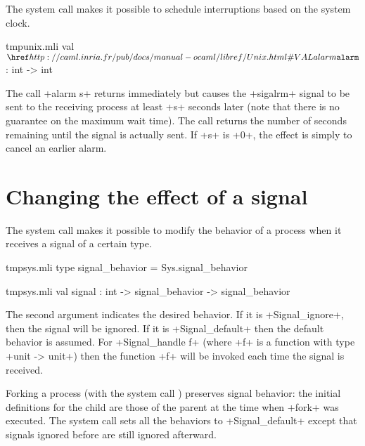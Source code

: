 The system call  makes it possible to schedule
interruptions based on the system clock.

%
\begin{listingcodefile}{tmpunix.mli}
val $\libvalue{Unix}{alarm}$ : int -> int
\end{listingcodefile}
%

The call \ml+alarm s+ returns immediately but causes the \ml+sigalrm+ 
signal to be sent to the receiving process at least \ml+s+ seconds later 
(note that there is no guarantee on the maximum wait time).  The call returns 
the number of seconds remaining until the signal is actually sent.  
If \ml+s+ is \ml+0+, the effect is simply to cancel an earlier alarm.

\section{Changing the effect of a signal}

The system call  makes it possible to modify the behavior
of a process when it receives a signal of a certain type.

%
\begin{codefile}{tmpsys.mli}
type signal_behavior = Sys.signal_behavior
\end{codefile}
%
\begin{listingcodefile}{tmpsys.mli}
val signal : int -> signal_behavior -> signal_behavior
\end{listingcodefile}
%

The second argument indicates the desired behavior.  If it is
\ml+Signal_ignore+, then the signal will be ignored.  If it is 
\ml+Signal_default+ then the default behavior is assumed.  For
\ml+Signal_handle f+ (where \ml+f+ is a function with type 
\ml+unit -> unit+) then the function \ml+f+ will be 
invoked each time the signal is received.

Forking a process (with the system call ) preserves 
signal behavior: the initial definitions for the child are those of 
the parent at the time when \ml+fork+ was executed.  The  
system call sets all the behaviors to \ml+Signal_default+ except that
signals ignored before are still ignored afterward.

